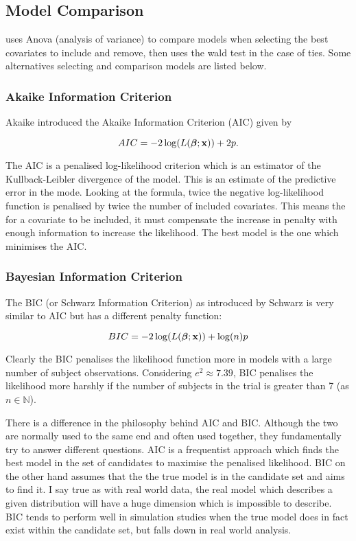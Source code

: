 \subsection{Model Comparison}\label{sec:model-comparison}

 uses Anova (analysis of variance) to compare models when selecting the best covariates to include and remove, then uses the wald test in the case of ties. Some alternatives selecting and comparison models are listed below.

\subsubsection{Akaike Information Criterion}

Akaike  introduced the Akaike Information Criterion (AIC) given by

\begin{equation}
    AIC = -2\log(L(\boldsymbol{\beta};\textbf{x}))+2p.
\end{equation}

The AIC is a penalised log-likelihood criterion which is an estimator of the Kullback-Leibler divergence of the model. This is an estimate of the predictive error in the mode. Looking at the formula, twice the negative log-likelihood function is penalised by twice the number of included covariates. This means the for a covariate to be included, it must compensate the increase in penalty with enough information to increase the likelihood. The best model is the one which minimises the AIC.

\subsubsection{Bayesian Information Criterion}

The BIC (or Schwarz Information Criterion) as introduced by Schwarz  is very similar to AIC but has a different penalty function:

\begin{equation}
    BIC = -2\log(L(\boldsymbol{\beta};\textbf{x}))+\log(n)p
\end{equation}

Clearly the BIC penalises the likelihood function more in models with a large number of subject observations. Considering $e^2\approx7.39$, BIC penalises the likelihood more harshly if the number of subjects in the trial is greater than 7 (as $n\in\mathbb{N}$).

There is a difference in the philosophy behind AIC and BIC. Although the two are normally used to the same end and often used together, they fundamentally try to answer different questions. AIC is a frequentist approach which finds the best model in the set of candidates to maximise the penalised likelihood. BIC on the other hand assumes that the the true model is in the candidate set and aims to find it. I say true as with real world data, the real model which describes a given distribution will have a huge dimension which is impossible to describe. BIC tends to perform well in simulation studies when the true model does in fact exist within the candidate set, but falls down in real world analysis.


